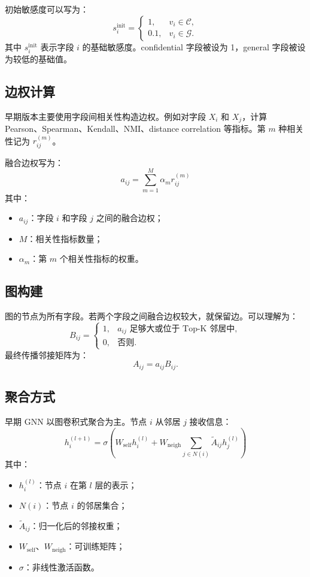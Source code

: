 \documentclass[UTF8]{ctexart}
\begin{document}
初始敏感度可以写为：
\[
s_i^{\text{init}}=
\begin{cases}
1, & v_i\in\mathcal{C},\\
0.1, & v_i\in\mathcal{G}.
\end{cases}
\]
其中 \(s_i^{\text{init}}\) 表示字段 \(i\) 的基础敏感度。confidential 字段被设为 1，general 字段被设为较低的基础值。

\subsection{边权计算}

早期版本主要使用字段间相关性构造边权。例如对字段 \(X_i\) 和 \(X_j\)，计算 Pearson、Spearman、Kendall、NMI、distance correlation 等指标。第 \(m\) 种相关性记为 \(r_{ij}^{(m)}\)。

融合边权写为：
\[
a_{ij}=\sum_{m=1}^{M}\alpha_m r_{ij}^{(m)}
\]
其中：
\begin{itemize}
    \item \(a_{ij}\)：字段 \(i\) 和字段 \(j\) 之间的融合边权；
    \item \(M\)：相关性指标数量；
    \item \(\alpha_m\)：第 \(m\) 个相关性指标的权重。
\end{itemize}

\subsection{图构建}

图的节点为所有字段。若两个字段之间融合边权较大，就保留边。可以理解为：
\[
B_{ij}=
\begin{cases}
1, & a_{ij}\text{ 足够大或位于 Top-K 邻居中},\\
0, & \text{否则}.
\end{cases}
\]
最终传播邻接矩阵为：
\[
A_{ij}=a_{ij}B_{ij}.
\]

\subsection{聚合方式}

早期 GNN 以图卷积式聚合为主。节点 \(i\) 从邻居 \(j\) 接收信息：
\[
h_i^{(l+1)}
=
\sigma
\left(
W_{\text{self}}h_i^{(l)}
+
W_{\text{neigh}}\sum_{j\in N(i)}\tilde{A}_{ij}h_j^{(l)}
\right)
\]
其中：
\begin{itemize}
    \item \(h_i^{(l)}\)：节点 \(i\) 在第 \(l\) 层的表示；
    \item \(N(i)\)：节点 \(i\) 的邻居集合；
    \item \(\tilde{A}_{ij}\)：归一化后的邻接权重；
    \item \(W_{\text{self}}\)、\(W_{\text{neigh}}\)：可训练矩阵；
    \item \(\sigma\)：非线性激活函数。
\end{itemize}
\end{document}

